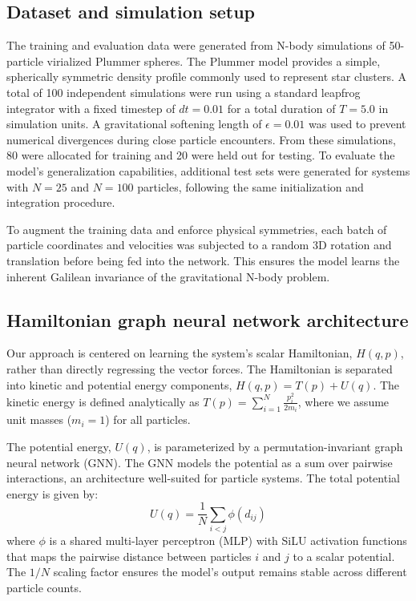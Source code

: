 \documentclass[]{article}
\begin{document}
\subsection{Dataset and simulation setup}
The training and evaluation data were generated from N-body simulations of 50-particle virialized Plummer spheres. The Plummer model provides a simple, spherically symmetric density profile commonly used to represent star clusters. A total of 100 independent simulations were run using a standard leapfrog integrator with a fixed timestep of $dt=0.01$ for a total duration of $T=5.0$ in simulation units. A gravitational softening length of $\epsilon=0.01$ was used to prevent numerical divergences during close particle encounters. From these simulations, 80 were allocated for training and 20 were held out for testing. To evaluate the model's generalization capabilities, additional test sets were generated for systems with $N=25$ and $N=100$ particles, following the same initialization and integration procedure.

To augment the training data and enforce physical symmetries, each batch of particle coordinates and velocities was subjected to a random 3D rotation and translation before being fed into the network. This ensures the model learns the inherent Galilean invariance of the gravitational N-body problem.

\subsection{Hamiltonian graph neural network architecture}
Our approach is centered on learning the system's scalar Hamiltonian, $H(q, p)$, rather than directly regressing the vector forces. The Hamiltonian is separated into kinetic and potential energy components, $H(q, p) = T(p) + U(q)$. The kinetic energy is defined analytically as $T(p) = \sum_{i=1}^{N} \frac{p_i^2}{2m_i}$, where we assume unit masses ($m_i=1$) for all particles.

The potential energy, $U(q)$, is parameterized by a permutation-invariant graph neural network (GNN). The GNN models the potential as a sum over pairwise interactions, an architecture well-suited for particle systems. The total potential energy is given by:
\begin{equation}
    U(q) = \frac{1}{N} \sum_{i<j} \phi(d_{ij})
\end{equation}
where $\phi$ is a shared multi-layer perceptron (MLP) with SiLU activation functions that maps the pairwise distance between particles $i$ and $j$ to a scalar potential. The $1/N$ scaling factor ensures the model's output remains stable across different particle counts.
\end{document}
